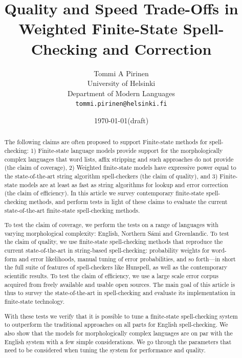 \documentclass[a4paper,12pt]{article}
\title{Quality and Speed Trade-Offs in
    Weighted Finite-State Spell-Checking and Correction}
\author{Tommi A Pirinen\\
 [0.5cm] University of Helsinki\\ %
 Department of Modern Languages\\ %
 \texttt{tommi.pirinen@helsinki.fi}}   %
\date{\today (draft)}
\begin{document}
\maketitle
\thispagestyle{empty}

\begin{abstract} \noindent The following claims are often proposed to support
    Finite-state methods for spell-checking: 1) Finite-state language models
    provide support for the morphologically complex languages that word lists,
    affix stripping and such approaches do not provide (the claim of coverage),
    2) Weighted finite-state models have expressive power equal to the
    state-of-the-art string algorithm spell-checkers (the claim of quality),
    and 3) Finite-state models are at least as fast as string algorithms for
    lookup and error correction (the claim of efficiency).  In this article we
    survey contemporary finite-state spell-checking methods, and perform tests
    in light of these claims to evaluate the current state-of-the-art
    finite-state spell-checking methods.

    To test the claim of coverage, we perform the tests on a range of
    languages with varying morphological complexity: English,
    Northern Sámi and Greenlandic.  To test the claim of quality, we use
    finite-state spell-checking methods that reproduce the current
    state-of-the-art in string-based spell-checking: probability weights for
    word-form and error likelihoods, manual tuning of error probabilities, and
    so forth---in short the full suite of features of spell-checkers like
    Hunspell, as well as the contemporary scientific results. To test the claim
    of efficiency, we use a large scale error corpus acquired from freely
    available and usable open sources. The main goal of this article is thus to
    survey the state-of-the-art in spell-checking and evaluate its
    implementation in finite-state technology.  

    With these tests we verify that it is possible to tune a finite-state
    spell-checking system to outperform the traditional approaches on all parts
    for English spell-checking. We also show that the models for
    morphologically complex languages are on par with the English system with a
    few simple considerations. We go through the parameters that need to
    be considered when tuning the system for performance and quality.

\end{abstract}


\makeatletter\let\chapter\@undefined\makeatother
\listoftodos
\end{document}
